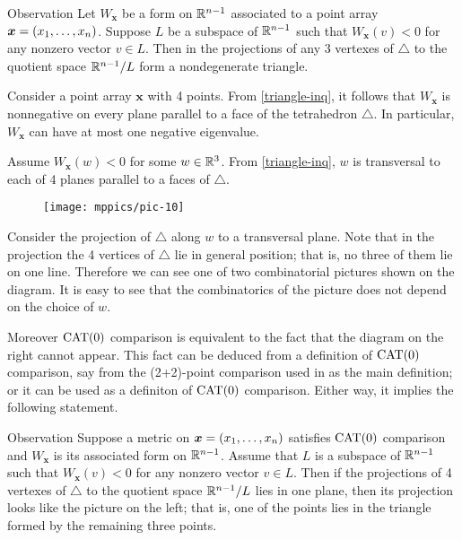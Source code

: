 \documentclass{article}
\begin{document}
\begin{thm}{Observation}\label{triangle-inq}
Let $W_{\bm{x}}$ be a form on $\mathbb{R}^{n-1}$ associated to a point array $\bm{x}\z=(x_1,\dots,x_n)$.
Suppose $L$ be a subspace of $\mathbb{R}^{n-1}$ such that
$W_{\bm{x}}(v)< 0$ for any nonzero vector $v\in L$.
Then in the projections of any 3 vertexes of $\triangle$ to the quotient space $\mathbb{R}^{n-1}/L$ form a nondegenerate triangle.
\end{thm}

Consider a point array $\bm{x}$ with 4 points.
From \ref{triangle-inq}, 
it follows that $W_{\bm{x}}$ 
is nonnegative on every plane parallel to a face of the tetrahedron $\triangle$.
In particular, $W_{\bm{x}}$ can have at most one negative eigenvalue.

Assume $W_{\bm{x}}(w)<0$ for some $w\in\mathbb{R}^3$.
From \ref{triangle-inq},
$w$ is transversal to each of 4 planes parallel to a faces of $\triangle$.

\begin{wrapfigure}{r}{33mm}
\vskip-4mm
\centering
\texttt{[image: mppics/pic-10]}
\end{wrapfigure}

Consider the projection of $\triangle$ along $w$ to a transversal plane. 
Note that in the projection the 4 vertices of $\triangle$ lie in general position; 
that is, no three of them lie on one line.
Therefore  we can see one of two combinatorial pictures shown on the diagram.
It is easy to see that the combinatorics of the picture does not depend on the choice of $w$.

Moreover $\mathrm{CAT}(0)$ comparison is equivalent to the fact that the diagram on the right cannot appear.
This fact can be deduced from a definition of $\mathrm{CAT}(0)$ comparison,
say from the (2+2)-point comparison used in \cite{alexander-kapovitch-petrunin} as the main definition;
or it can be used as a definiton of $\mathrm{CAT}(0)$ comparison.
Either way, it implies the following statement.


\begin{thm}{Observation}\label{cat0-proj}
Suppose a metric on $\bm{x}\z=(x_1,\dots,x_n)$ satisfies $\mathrm{CAT}(0)$ comparison
and $W_{\bm{x}}$ is its associated form on $\mathbb{R}^{n-1}$.
Assume that $L$ is a subspace of $\mathbb{R}^{n-1}$ such that
$W_{\bm{x}}(v)< 0$ for any nonzero vector $v\in L$.
Then if the projections of 4 vertexes of $\triangle$ to the quotient space $\mathbb{R}^{n-1}/L$ lies in one plane, then its projection looks like the picture on the left;
that is, one of the points lies in the triangle formed by the remaining three points.
\end{thm}
\end{document}
